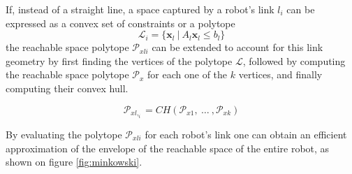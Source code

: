 If, instead of a straight line, a space captured by a robot's link $l_i$ can be expressed as a convex set of constraints or a polytope
\begin{equation}
    \mathcal{L}_i = \Big \{ \bm{x}_l ~ |~ A_l \bm{x}_l \leq b_l \Big\}
\end{equation}
the reachable space polytope $\mathcal{P}_{xli}$ can be extended to account for this link geometry by first finding the vertices of the polytope $\mathcal{L}$, followed by computing the reachable space polytope $\mathcal{P}_{x}$ for each one of the $k$ vertices, and finally computing their convex hull. 

\begin{equation}
    \mathcal{P}_{xl,_i} = CH \left(  \mathcal{P}_{x1}, ~ \dots ~, \mathcal{P}_{xk} \right)
\end{equation}

By evaluating the polytope $\mathcal{P}_{xli}$ for each robot's link one can obtain an efficient approximation of the envelope of the reachable space of the entire robot, as shown on figure \ref{fig:minkowski}.



